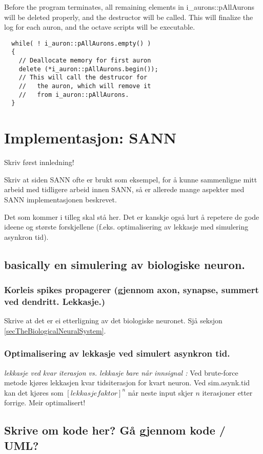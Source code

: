 Before the program terminates, all remaining elements in i\_aurons::pAllAurons will be deleted properly, and the destructor will be called.
This will finalize the log for each auron, and the octave scripts will be executable.

\begin{lstlisting}
  while( ! i_auron::pAllAurons.empty() ) 
  { 
    // Deallocate memory for first auron
    delete (*i_auron::pAllAurons.begin()); 
    // This will call the destrucor for
    //   the auron, which will remove it
    //   from i_auron::pAllAurons.
  }   
\end{lstlisting}






\section{Implementasjon: SANN}
	Skriv først innledning!

	Skriv at siden SANN ofte er brukt som eksempel, for å kunne sammenligne mitt arbeid med tidligere arbeid innen SANN, så er allerede mange aspekter med SANN implementasjonen beskrevet.

	Det som kommer i tilleg skal stå her.
	Det er kanskje også lurt å repetere de gode ideene og største forskjellene (f.eks. optimalisering av lekkasje med simulering asynkron tid).
	\subsection{basically en simulering av biologiske neuron.}
		\subsubsection{Korleis spikes propagerer (gjennom axon, synapse, summert ved dendritt. Lekkasje.)}
		Skrive at det er ei etterligning av det biologiske neuronet. Sjå seksjon \ref{secTheBiologicalNeuralSystem}.

	\subsubsection{Optimalisering av lekkasje ved simulert asynkron tid.}
		\emph{lekkasje ved kvar iterasjon vs. lekkasje bare når innsignal :}
			Ved brute-force metode kjøres lekkasjen kvar tidsiterasjon for kvart neuron. Ved sim.asynk.tid kan det kjøres som $[lekkasjefaktor]^n$ når neste input skjer $n$ iterasjoner etter forrige. Meir optimalisert!

	\subsection{Skrive om kode her? Gå gjennom kode / UML?}




